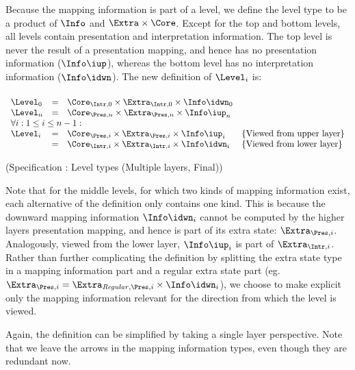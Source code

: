 Because the mapping information is part of a level, we define the level type to be a product of $\Info$ and 
$\Extra \times \Core$. Except for the top and bottom levels, all levels contain presentation and interpretation information. The top level is never the result of a presentation mapping, and hence has no presentation information ($\Info\iup$), whereas the bottom level has no interpretation information ($\Info\idwn$). The new definition of $\Level_i$ is:

\begin{small}
 \label{spec:levelMultiFinal}
\begin{align*}%
\end{align*} 
\(\begin{array}{lcll}
\Level_{0} & = & \Core_{\Intr,0} \times \Extra_{\Intr,0} \times \Info\idwn_{0} \\
\Level_{n} & = & \Core_{\Pres,n} \times \Extra_{\Pres,n} \times  \Info\iup_{n}\\
\lefteqn{\forall i:1 \le i \le n-1:}  \\
\Level_{i} & = & \Core_{\Pres,i} \times \Extra_{\Pres,i}  \times \Info\iup_{i} & \text{\{Viewed from upper layer\}}\\  
               & = & \Core_{\Intr,i} \times \Extra_{\Intr,i} \times \Info\idwn_{i} & \text{\{Viewed from lower layer\}}
\end{array}\)\end{small}
\begin{center}(Specification \thespecification: Level types (Multiple layers, Final))\end{center}\vspace{1em}

Note that for the middle levels, for which two kinds of mapping information exist, each alternative of the definition only contains one kind. This is because the downward mapping information $\Info\idwn_{i}$ cannot be computed by the higher layers presentation mapping, and hence is part of its extra state: $\Extra_{\Pres,i}$. Analogously, viewed from the lower layer, $\Info\iup_{i}$ is part of $\Extra_{\Intr,i}$. Rather than further complicating the definition by splitting the extra state type in a mapping information part and a regular extra state part (eg. $\Extra_{\Pres,i} = \Extra_{\mathit{Regular},\Pres,i} \times \Info\idwn_{i}$), we choose to make explicit only the mapping information relevant for the direction from which the level is viewed.

Again, the definition can be simplified by taking a single layer perspective. Note that we leave the arrows in the  mapping information types, even though they are redundant now.

